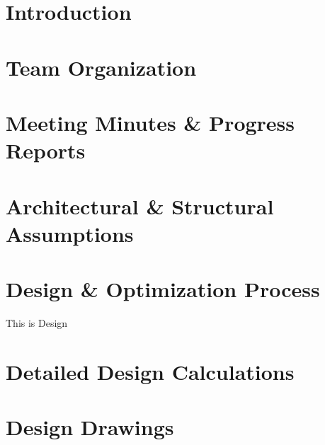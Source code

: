 \documentclass[12pt,twoside,a4paper,openany]{report}
\begin{document}


\section{Introduction}

\clearpage
\section{Team Organization}
\clearpage
\section{Meeting Minutes \& Progress Reports}
\clearpage
\section{Architectural \& Structural Assumptions}

\clearpage
\section{Design \& Optimization Process}
This is Design
\clearpage
\section{Detailed Design Calculations}


\clearpage
\section{Design Drawings}

\clearpage
\end{document}
